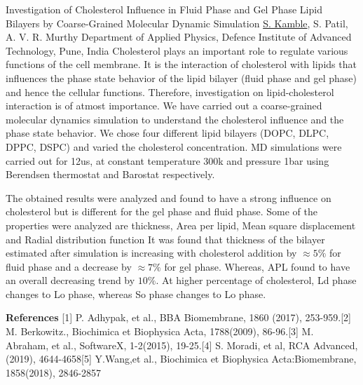 
    \begin{abstract_online}{Investigation of Cholesterol Influence in Fluid Phase and Gel Phase Lipid Bilayers by Coarse-Grained Molecular Dynamic Simulation}{%
        \underline{S. Kamble}, S. Patil, A. V. R. Murthy}{%
        }{%
        Department of Applied Physics, Defence Institute of Advanced Technology, Pune, India}
    Cholesterol plays an important role to regulate various functions of the cell membrane. It is the interaction of cholesterol with lipids that influences the phase state behavior of the lipid bilayer (fluid phase and gel phase) and hence the cellular functions. Therefore, investigation on lipid-cholesterol interaction is of atmost importance. We have carried out a coarse-grained molecular dynamics simulation to understand the cholesterol influence and the phase state behavior. We chose four different lipid bilayers (DOPC, DLPC, DPPC, DSPC) and varied the cholesterol concentration. MD simulations were carried out for 12us, at constant temperature 300k and pressure 1bar using Berendsen thermostat and Barostat respectively. \par The obtained results were analyzed and found to have a strong influence on cholesterol but is different for the gel phase and fluid phase. Some of the properties were analyzed are thickness, Area per lipid, Mean square displacement and Radial distribution function It was found that thickness of the bilayer estimated after simulation is increasing with cholesterol addition by $\approx 5 \%$ for fluid phase and a decrease by $\approx 7 \%$ for gel phase. Whereas, APL found to have an overall decreasing trend by $10 \%$. At higher percentage of cholesterol, Ld phase changes to Lo phase, whereas So phase changes to Lo phase. 
    
        \textbf{References} \newline{}[1] P. Adhypak, et al., BBA Biomembrane, 1860 (2017), 253-959.\newline{}[2] M. Berkowitz., Biochimica et Biophysica Acta, 1788(2009), 86-96.\newline{}[3] M. Abraham, et al., SoftwareX, 1-2(2015), 19-25.\newline{}[4] S. Moradi, et al, RCA Advanced, (2019), 4644-4658\newline{}[5] Y.Wang,et al., Biochimica et Biophysica Acta:Biomembrane, 1858(2018), 2846-2857
    \end{abstract_online}
    